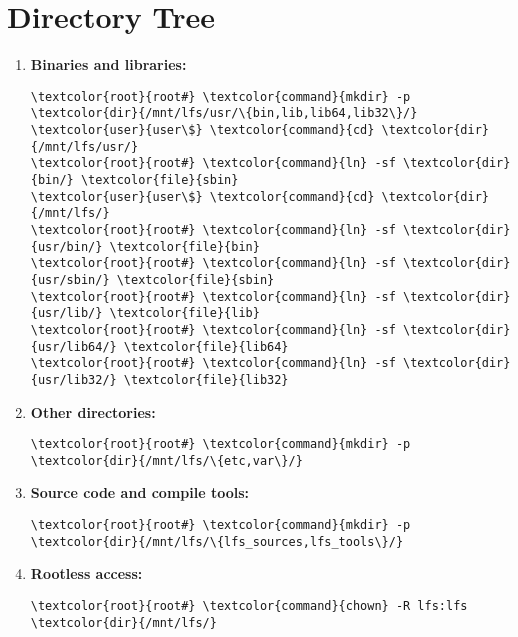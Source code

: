 \documentclass[10pt, a4paper, onecolumn, oneside, titlepage, openany]{book}
\begin{document}
\section{Directory Tree}
\begin{enumerate}
    \item \textbf{Binaries and libraries:}
\begin{Verbatim}[commandchars=\\\{\}]
\textcolor{root}{root#} \textcolor{command}{mkdir} -p \textcolor{dir}{/mnt/lfs/usr/\{bin,lib,lib64,lib32\}/}
\textcolor{user}{user\$} \textcolor{command}{cd} \textcolor{dir}{/mnt/lfs/usr/}
\textcolor{root}{root#} \textcolor{command}{ln} -sf \textcolor{dir}{bin/} \textcolor{file}{sbin}
\textcolor{user}{user\$} \textcolor{command}{cd} \textcolor{dir}{/mnt/lfs/}
\textcolor{root}{root#} \textcolor{command}{ln} -sf \textcolor{dir}{usr/bin/} \textcolor{file}{bin}
\textcolor{root}{root#} \textcolor{command}{ln} -sf \textcolor{dir}{usr/sbin/} \textcolor{file}{sbin}
\textcolor{root}{root#} \textcolor{command}{ln} -sf \textcolor{dir}{usr/lib/} \textcolor{file}{lib}
\textcolor{root}{root#} \textcolor{command}{ln} -sf \textcolor{dir}{usr/lib64/} \textcolor{file}{lib64}
\textcolor{root}{root#} \textcolor{command}{ln} -sf \textcolor{dir}{usr/lib32/} \textcolor{file}{lib32}
\end{Verbatim}
    \item \textbf{Other directories:}
\begin{Verbatim}[commandchars=\\\{\}]
\textcolor{root}{root#} \textcolor{command}{mkdir} -p \textcolor{dir}{/mnt/lfs/\{etc,var\}/}
\end{Verbatim}
    \item \textbf{Source code and compile tools:}
\begin{Verbatim}[commandchars=\\\{\}]
\textcolor{root}{root#} \textcolor{command}{mkdir} -p \textcolor{dir}{/mnt/lfs/\{lfs_sources,lfs_tools\}/}
\end{Verbatim}
    \item \textbf{Rootless access:}
\begin{Verbatim}[commandchars=\\\{\}]
\textcolor{root}{root#} \textcolor{command}{chown} -R lfs:lfs \textcolor{dir}{/mnt/lfs/}
\end{Verbatim}
\end{enumerate}
\end{document}
